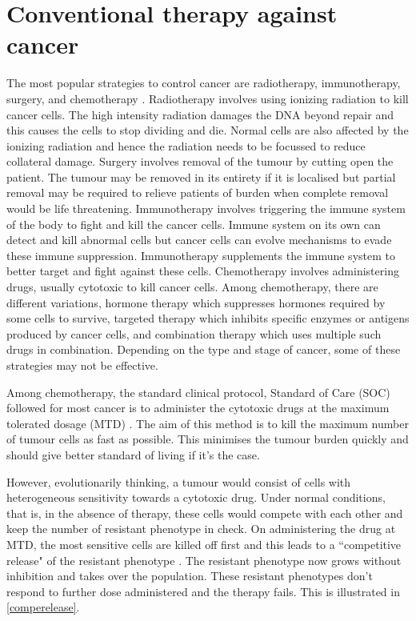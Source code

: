 \section{Conventional therapy against cancer}
The most popular strategies to control cancer are radiotherapy, immunotherapy, surgery, and chemotherapy \cite{cancer_therapy}. Radiotherapy involves using ionizing radiation to kill cancer cells. The high intensity radiation damages the DNA beyond repair and this causes the cells to stop dividing and die. Normal cells are also affected by the ionizing radiation and hence the radiation needs to be focussed to reduce collateral damage. Surgery involves removal of the tumour by cutting open the patient. The tumour may be removed in its entirety if it is localised but partial removal may be required to relieve patients of burden when complete removal would be life threatening. Immunotherapy involves triggering the immune system of the body to fight and kill the cancer cells. Immune system on its own can detect and kill abnormal cells but cancer cells can evolve mechanisms to evade these immune suppression. Immunotherapy supplements the immune system to better target and fight against these cells. Chemotherapy involves administering drugs, usually cytotoxic to kill cancer cells. Among chemotherapy, there are different variations, hormone therapy which suppresses hormones required by some cells to survive, targeted therapy which inhibits specific enzymes or antigens produced by cancer cells, and combination therapy which uses multiple such drugs in combination. Depending on the type and stage of cancer, some of these strategies may not be effective.

Among chemotherapy, the standard clinical protocol, Standard of Care (SOC) followed for most cancer is to administer the cytotoxic drugs at the maximum tolerated dosage (MTD) \cite{Frei}. The aim of this method is to kill the maximum number of tumour cells as fast as possible. This minimises the tumour burden quickly and should give better standard of living if it's the case.

However, evolutionarily thinking, a tumour would consist of cells with  heterogeneous sensitivity towards a cytotoxic drug. Under normal conditions, that is, in the absence of therapy, these cells would compete with each other and keep the number of resistant phenotype in check. On administering the drug at MTD, the most sensitive cells are killed off first and this leads to a ``competitive release" of the resistant phenotype \cite{Scott}. The resistant phenotype now grows without inhibition and takes over the population. These resistant phenotypes don't respond to further dose administered and the therapy fails. This is illustrated in \autoref{comperelease}.

